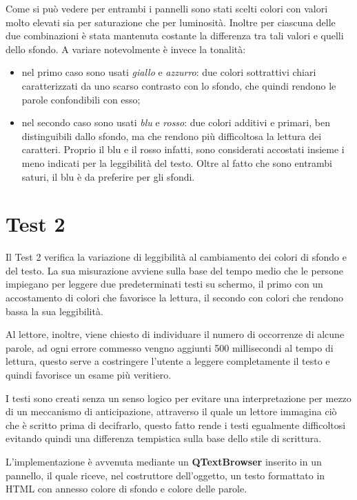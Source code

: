 \documentclass[a4paper]{article}
\begin{document}
Come si può vedere per entrambi i pannelli sono stati scelti colori con valori molto elevati sia per saturazione che per luminosità. Inoltre per ciascuna delle due combinazioni è stata mantenuta costante la differenza tra tali valori e quelli dello sfondo.
A variare notevolmente è invece la tonalità:
\begin{itemize}
\item nel primo caso sono usati \emph{giallo} e \emph{azzurro}: due colori sottrattivi chiari caratterizzati da uno scarso contrasto con lo sfondo, che quindi rendono le parole confondibili con esso;
\item nel secondo caso sono usati \emph{blu} e \emph{rosso}: due colori additivi e primari, ben distinguibili dallo sfondo, ma che rendono più difficoltosa la lettura dei caratteri. Proprio il blu e il rosso infatti, sono considerati accostati insieme i meno indicati per la leggibilità del testo. Oltre al fatto che sono entrambi saturi, il blu è da preferire per gli sfondi.
\end{itemize}

\section{Test 2}
Il Test 2 verifica la variazione di leggibilità al cambiamento dei colori di sfondo e del testo.
La sua misurazione avviene sulla base del tempo medio che le persone impiegano per leggere due predeterminati testi su schermo, il primo con un accostamento 
di colori che favorisce la lettura, il secondo con colori che rendono bassa la sua leggibilità.

Al lettore, inoltre, viene chiesto di individuare il numero di occorrenze di alcune parole, ad ogni errore commesso vengno aggiunti 500 millisecondi al tempo di lettura,
questo serve a costringere l'utente a leggere completamente il testo e quindi favorisce un esame più veritiero.

I testi sono creati senza un senso logico per evitare una interpretazione per mezzo di un meccanismo di anticipazione, attraverso il quale
un lettore immagina ciò che è scritto prima di decifrarlo, questo fatto rende i testi egualmente difficoltosi 
evitando quindi una differenza tempistica sulla base dello stile di scrittura.

L'implementazione è avvenuta mediante un \textbf{QTextBrowser} inserito in un pannello, il quale riceve, nel costruttore dell'oggetto, 
un testo formattato in HTML con annesso colore di sfondo e colore delle parole.
\end{document}
